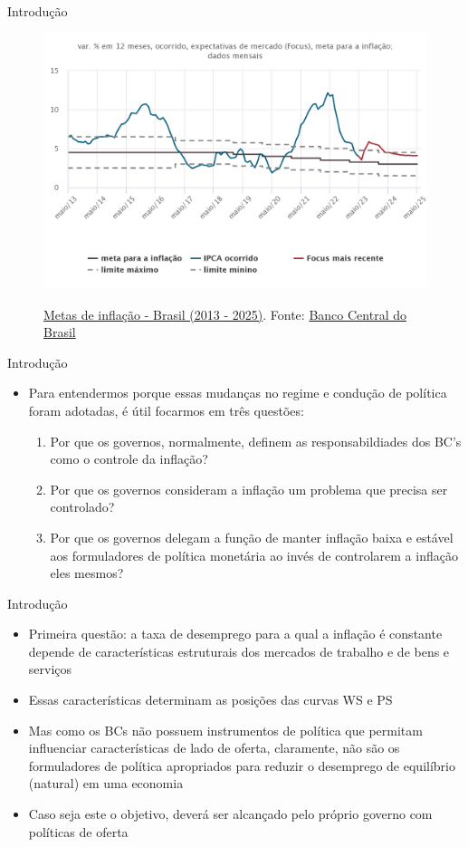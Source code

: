 \documentclass[10pt]{beamer}
\begin{document}
\begin{frame}
    {Introdução}
    \begin{figure}
        \href{https://www.bcb.gov.br/estatisticas}{\includegraphics[width=.65\textwidth]{./figures/aula15_fig1.png}}
        \caption{\href{https://www.bcb.gov.br/estatisticas}{Metas de inflação - Brasil (2013 - 2025)}. Fonte: \href{https://www.bcb.gov.br/}{Banco Central do Brasil}}
    \end{figure}
\end{frame}

\begin{frame}
    {Introdução}
    \begin{itemize}
        \item Para entendermos porque essas mudanças no regime e condução de política foram adotadas, é útil focarmos em três questões:\medskip
        \begin{enumerate}
            \item Por que os governos, normalmente, definem as responsabildiades dos BC's como o controle da inflação?\medskip
            \item Por que os governos consideram a inflação um problema que precisa ser controlado?\medskip
            \item Por que os governos delegam a função de manter inflação baixa e estável aos formuladores de política monetária ao invés de controlarem a inflação eles mesmos?
        \end{enumerate}
    \end{itemize}
\end{frame}

\begin{frame}
    {Introdução}
    \begin{itemize}
        \item Primeira questão: a taxa de desemprego para a qual a inflação é constante depende de características estruturais dos mercados de trabalho e de bens e serviços\bigskip
        \item Essas características determinam as posições das curvas WS e PS\bigskip
        \item Mas como os BCs não possuem instrumentos de política que permitam influenciar características de lado de oferta, claramente, não são os formuladores de política apropriados para reduzir o desemprego de equilíbrio (natural) em uma economia\bigskip
        \item Caso seja este o objetivo, deverá ser alcançado pelo próprio governo com políticas de oferta
    \end{itemize}
\end{frame}
\end{document}
